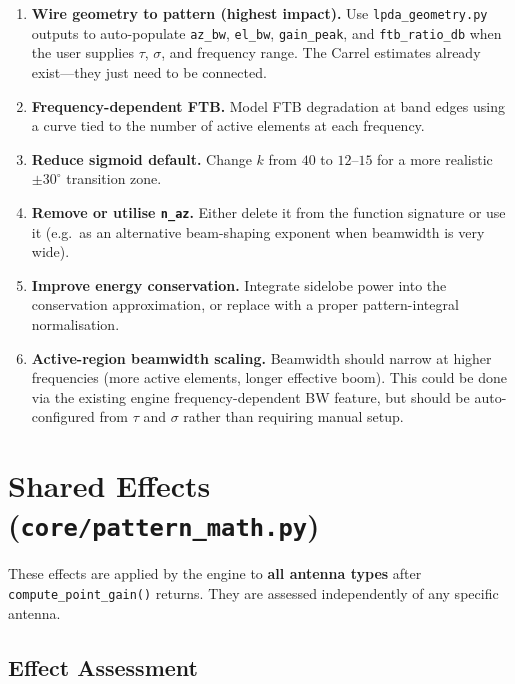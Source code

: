 \documentclass[11pt,a4paper]{article}
\newcommand{\grade}[2]{%
    \par\noindent\fcolorbox{#1}{#1!10}{%
        \parbox{0.95\textwidth}{\textbf{\color{#1}Grade: #2}}%
    }\par\medskip
}
\begin{document}
\begin{enumerate}[nosep]
    \item \textbf{Wire geometry to pattern (highest impact).} Use \texttt{lpda\_geometry.py} outputs to auto-populate \texttt{az\_bw}, \texttt{el\_bw}, \texttt{gain\_peak}, and \texttt{ftb\_ratio\_db} when the user supplies $\tau$, $\sigma$, and frequency range. The Carrel estimates already exist---they just need to be connected.
    \item \textbf{Frequency-dependent FTB.} Model FTB degradation at band edges using a curve tied to the number of active elements at each frequency.
    \item \textbf{Reduce sigmoid default.} Change $k$ from $40$ to $12$--$15$ for a more realistic $\pm 30^\circ$ transition zone.
    \item \textbf{Remove or utilise \texttt{n\_az}.} Either delete it from the function signature or use it (e.g.\ as an alternative beam-shaping exponent when beamwidth is very wide).
    \item \textbf{Improve energy conservation.} Integrate sidelobe power into the conservation approximation, or replace with a proper pattern-integral normalisation.
    \item \textbf{Active-region beamwidth scaling.} Beamwidth should narrow at higher frequencies (more active elements, longer effective boom). This could be done via the existing engine frequency-dependent BW feature, but should be auto-configured from $\tau$ and $\sigma$ rather than requiring manual setup.
\end{enumerate}


\newpage
\section{Shared Effects (\texttt{core/pattern\_math.py})}

\grade{afblue}{B+}

These effects are applied by the engine to \textbf{all antenna types} after
\texttt{compute\_point\_gain()} returns. They are assessed independently of any
specific antenna.

\subsection{Effect Assessment}
\end{document}
